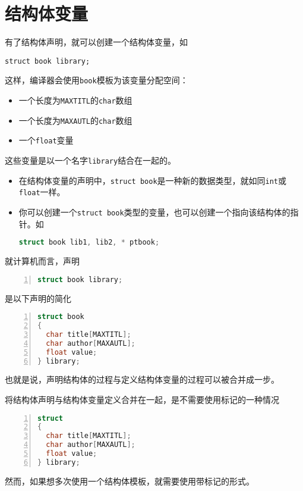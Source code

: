 \section{结构体变量}
\begin{frame}[fragile]\ft{\secname}
有了结构体声明，就可以创建一个结构体变量，如
\begin{lstlisting}
struct book library;  
\end{lstlisting}
这样，编译器会使用\verb|book|模板为该变量分配空间：
\begin{itemize}
  \item 一个长度为\verb|MAXTITL|的\verb|char|数组
  \item 一个长度为\verb|MAXAUTL|的\verb|char|数组
  \item 一个\verb|float|变量
\end{itemize}
这些变量是以一个名字\verb|library|结合在一起的。
\end{frame}

\begin{frame}[fragile]\ft{\secname}
  \begin{itemize}
  \item  在结构体变量的声明中，\verb|struct book|是一种新的数据类型，就如同\verb|int|或\verb|float|一样。\\[0.1in]
  \item 你可以创建一个\verb|struct book|类型的变量，也可以创建一个指向该结构体的指针。如
\begin{lstlisting}[language=c,backgroundcolor=\color{red!20}]
struct book lib1, lib2, * ptbook;  
\end{lstlisting}
  \end{itemize}
\end{frame}

\begin{frame}[fragile]\ft{\secname}

就计算机而言，声明
\begin{lstlisting}[language=c,numbers=left,frame=single]
struct book library;  
\end{lstlisting}
是以下声明的简化
\begin{lstlisting}[language=c,numbers=left,frame=single]
struct book
{
  char title[MAXTITL];
  char author[MAXAUTL];
  float value;
} library;  
\end{lstlisting}
也就是说，声明结构体的过程与定义结构体变量的过程可以被合并成一步。
\end{frame}

\begin{frame}[fragile]\ft{\secname}

将结构体声明与结构体变量定义合并在一起，是不需要使用标记的一种情况
\begin{lstlisting}[language=c,numbers=left,frame=single]
struct 
{
  char title[MAXTITL];
  char author[MAXAUTL];
  float value;
} library;  
\end{lstlisting}
然而，如果想多次使用一个结构体模板，就需要使用带标记的形式。
\end{frame}


